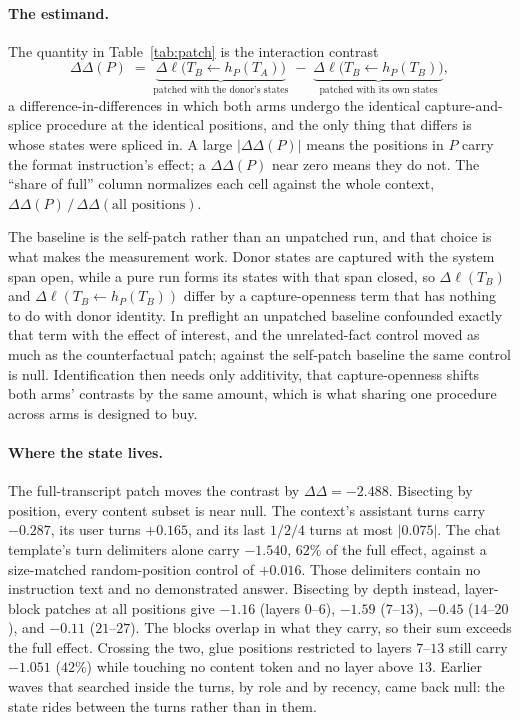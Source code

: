 \documentclass{article}
\begin{document}
\paragraph{The estimand.}
The quantity in Table~\ref{tab:patch} is the interaction contrast
\[
  \Delta\Delta(P) \;=\; \underbrace{\Delta\ell\big(T_B \leftarrow h_P(T_A)\big)}_{\text{patched with the donor's states}}
  \;-\;
  \underbrace{\Delta\ell\big(T_B \leftarrow h_P(T_B)\big)}_{\text{patched with its own states}},
\]
a difference-in-differences in which both arms undergo the identical capture-and-splice
procedure at the identical positions, and the only thing that differs is whose states were
spliced in. A large $|\Delta\Delta(P)|$ means the positions in $P$ carry the format
instruction's effect; a $\Delta\Delta(P)$ near zero means they do not. The ``share of full''
column normalizes each cell against the whole context,
$\Delta\Delta(P)\,/\,\Delta\Delta(\text{all positions})$.

The baseline is the self-patch rather than an unpatched run, and that choice is what makes the
measurement work. Donor states are captured with the system span open, while a pure run forms
its states with that span closed, so $\Delta\ell(T_B)$ and
$\Delta\ell(T_B \leftarrow h_P(T_B))$ differ by a capture-openness term that has nothing to do
with donor identity. In preflight an unpatched baseline confounded exactly that term with the
effect of interest, and the unrelated-fact control moved as much as the counterfactual patch;
against the self-patch baseline the same control is null. Identification then needs only
additivity, that capture-openness shifts both arms' contrasts by the same amount, which is
what sharing one procedure across arms is designed to buy.

\paragraph{Where the state lives.}
The full-transcript patch moves the contrast by $\Delta\Delta = -2.488$. Bisecting by position,
every content subset is near null. The context's assistant turns carry $-0.287$, its
user turns $+0.165$, and its last $1/2/4$ turns at most $|0.075|$. The chat template's turn
delimiters alone carry $\mathbf{-1.540}$, $62\%$ of the full effect, against a size-matched
random-position control of $+0.016$. Those delimiters contain no instruction text and no
demonstrated answer. Bisecting by depth instead, layer-block patches at all positions give
$-1.16$ (layers $0$--$6$), $-1.59$ ($7$--$13$), $-0.45$ ($14$--$20$), and $-0.11$
($21$--$27$). The blocks overlap in what they carry, so their sum exceeds the full effect.
Crossing the two, glue positions restricted to layers $7$--$13$ still carry $-1.051$ ($42\%$)
while touching no content token and no layer above $13$. Earlier waves that searched
inside the turns, by role and by recency, came back null: the state rides
between the turns rather than in them.
\end{document}
